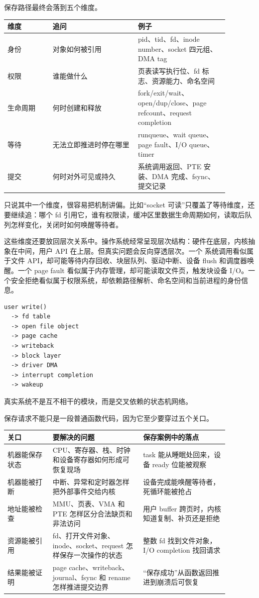 保存路径最终会落到五个维度。

\begin{longtable}{|p{0.18\linewidth}|p{0.34\linewidth}|p{0.36\linewidth}|}
\toprule
维度 & 追问 & 例子 \\
\midrule
身份 & 对象如何被引用 & pid、tid、fd、inode number、socket 四元组、DMA tag \\\tablerowrule
权限 & 谁能做什么 & 页表读写执行位、fd 标志、资源能力、命名空间 \\\tablerowrule
生命周期 & 何时创建和释放 & fork/exit/wait、open/dup/close、page refcount、request completion \\\tablerowrule
等待 & 无法立即推进时停在哪里 & runqueue、wait queue、page fault、I/O queue、timer \\\tablerowrule
提交 & 何时对外可见或持久 & 系统调用返回、PTE 安装、DMA 完成、fsync、提交记录 \\
\bottomrule
\end{longtable}

只说其中一个维度，很容易把机制讲偏。比如“socket 可读”只覆盖了等待维度，还要继续追：哪个 fd 引用它，谁有权限读，缓冲区里数据生命周期如何，读取后队列怎样变化，关闭时如何唤醒等待者。

这些维度还要放回层次关系中。操作系统经常呈现层次结构：硬件在底层，内核抽象在中间，用户 API 在上层。但真实问题会反向穿透层次。一个  系统调用看似属于文件 API，却可能等待内存回收、块层队列、驱动中断、设备 flush 和调度器唤醒。一个 page fault 看似属于内存管理，却可能读取文件页，触发块设备 I/O。一个安全拒绝看似属于权限系统，却依赖路径解析、命名空间和当前进程的身份信息。

\begin{lstlisting}
user write()
  -> fd table
  -> open file object
  -> page cache
  -> writeback
  -> block layer
  -> driver DMA
  -> interrupt completion
  -> wakeup
\end{lstlisting}

真实系统不是互不相干的模块，而是交叉依赖的状态机网络。

保存请求不能只是一段普通函数代码，因为它至少要穿过五个关口。

\begin{longtable}{|p{0.18\linewidth}|p{0.36\linewidth}|p{0.34\linewidth}|}
\toprule
关口 & 要解决的问题 & 保存案例中的落点 \\
\midrule
机器能保存状态 & CPU、寄存器、栈、时钟和设备寄存器如何形成可恢复现场 & task 能从睡眠处回来，设备 ready 位能被观察 \\\tablerowrule
机器能被打断 & 中断、异常和定时器怎样把外部事件交给内核 & 设备完成能唤醒等待者，死循环能被抢占 \\\tablerowrule
地址能被检查 & MMU、页表、VMA 和 PTE 怎样区分合法缺页和非法访问 & 用户 buffer 跨页时，内核知道复制、补页还是拒绝 \\\tablerowrule
资源能被引用 & fd、打开文件对象、inode、socket、request 怎样保存一次操作的状态 & 整数 fd 找到文件对象，I/O completion 找回请求 \\\tablerowrule
结果能被证明 & page cache、writeback、journal、fsync 和 rename 怎样推进提交边界 & “保存成功”从函数返回推进到崩溃后可恢复 \\
\bottomrule
\end{longtable}

